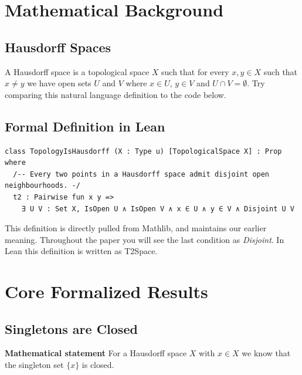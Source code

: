 \documentclass[11pt]{article}
\begin{document}
\section{Mathematical Background}

\subsection{Hausdorff Spaces}

A Hausdorff space is a topological space $X$ such that for every $x, y \in X$ such that $x \not = y$ we have open sets $U$ and $V$ where $x \in U$, $y \in V$ and $U \cap V = \emptyset$. Try comparing this natural language definition to the code below. 

\subsection{Formal Definition in Lean}

\begin{verbatim}
class TopologyIsHausdorff (X : Type u) [TopologicalSpace X] : Prop where
  /-- Every two points in a Hausdorff space admit disjoint open neighbourhoods. -/
  t2 : Pairwise fun x y =>
    ∃ U V : Set X, IsOpen U ∧ IsOpen V ∧ x ∈ U ∧ y ∈ V ∧ Disjoint U V
\end{verbatim}

This definition is directly pulled from Mathlib, and maintains our earlier meaning. Throughout the paper you will see the last condition as \emph{Disjoint}. In Lean this definition is written as T2Space. 

\section{Core Formalized Results}

\subsection{Singletons are Closed}

\textbf{Mathematical statement} 
For a Hausdorff space $X$ with $x \in X$ we know that the singleton set $\{x\}$ is closed. 
\end{document}
